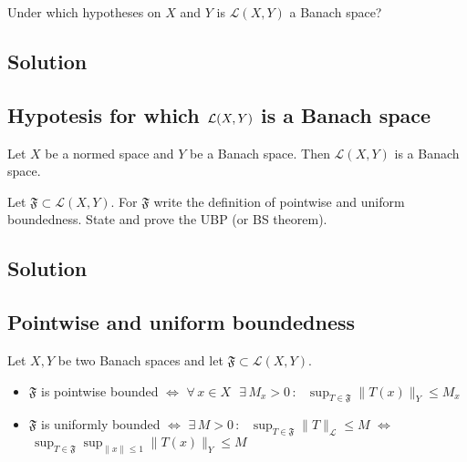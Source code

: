
\question
Under which hypotheses on $X$ and $Y$ is $\mathcal{L}(X,Y)$ a Banach space?

\subsection*{Solution}

\subsection{Hypotesis for which \texorpdfstring{$\mathcal{L}(X,Y)$}{the space of linear operators} is a Banach space}
Let $X$ be a normed space and $Y$ be a Banach space. Then $\mathcal{L}(X,Y)$ is a Banach space.


\question
Let $\mathfrak{F}\subset\mathcal{L}(X,Y)$. For $\mathfrak{F}$ write the definition of pointwise and uniform boundedness. State and prove the UBP (or BS theorem).

\subsection*{Solution}

\subsection{Pointwise and uniform boundedness}
Let $X,Y$ be two Banach spaces and let $\mathfrak{F}\subset\mathcal{L}(X,Y)$.
\begin{itemize}
    \item $\mathfrak{F}$ is pointwise bounded $\iff$ $\forall\,x\in X\,$ $\,\exists\,M_x>0\,:\,$ $\,\displaystyle\sup_{T\in\mathfrak{F}}\|T(x)\|_Y\leq M_x$
    \item $\mathfrak{F}$ is uniformly bounded $\iff$ $\exists\,M>0\,:\,$ $\,\displaystyle\sup_{T\in\mathfrak{F}}\|T\|_\mathcal{L}\leq M$ $\iff$ $\,\displaystyle\sup_{T\in\mathfrak{F}}\sup_{\|x\|\leq1}\|T(x)\|_Y\leq M$ 
\end{itemize}
 
